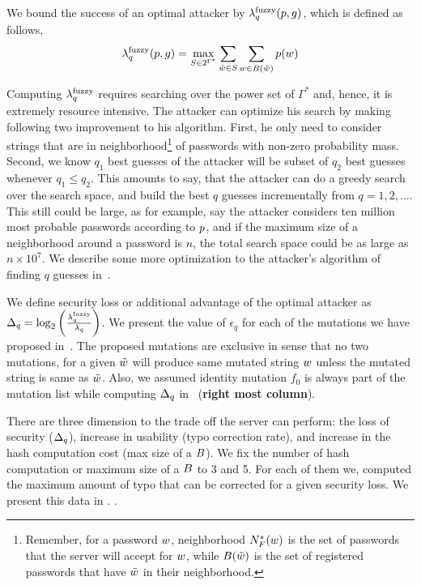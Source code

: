 We bound the success of an optimal attacker by
$\lambda^\textnormal{fuzzy}_q(p, g)$, which is defined as follows,
\[
  \lambda^\textnormal{fuzzy}_q(p, g) = \max_{S\in 2^{\Gamma^*}}\sum_{\tilde{w}\in S}\sum_{{w}\in B(\tilde{w})} p({w}) 
\]

Computing $\lambda^\textnormal{fuzzy}_q$ requires searching over the power set of
$\Gamma^*$ and, hence, it is extremely resource intensive. The
attacker can optimize his search by making following two improvement
to his algorithm. First, he only need to consider strings that are in
neighborhood\footnote{Remember, for a password ${w}$, neighborhood
  $N^*_F({w})$ is the set of passwords that the server will accept
  for ${w}$, while $B(\tilde{w})$ is the set of registered passwords
  that have $\tilde{w}$ in their neighborhood.} of passwords with
non-zero probability mass.  Second, we know $q_1$ best guesses of the
attacker will be subset of $q_2$ best guesses whenever $q_1\le q_2$.
This amounts to say, that the attacker can do a greedy search over the
search space, and build the best $q$ guesses incrementally from
$q=1,2,...$.  This still could be large, as for example, say the
attacker considers ten million most probable passwords according to
$p$, and if the maximum size of a neighborhood around a password
is $n$, the total search space could be as large as $n\times 10^7$. We
describe some more optimization to the attacker's algorithm of finding
$q$ guesses in~.


We define security loss or additional advantage of the optimal
attacker as
$ \Delta_q = \log_2\left(\lambda^\textnormal{fuzzy}_q\over\lambda_q\right)$.  We
present the value of $\epsilon_q$ for each of the mutations we have
proposed in~.  The proposed mutations are
exclusive in sense that no two mutations, for a given $\tilde{w}$ will
produce same mutated string ${w}$ unless the mutated string is same as
$\tilde{w}$. Also, we assumed identity mutation $f_0$ is always part of
the mutation list while computing $\Delta_q$
in~ (\textbf{right most column}).


There are three dimension to the trade off the server can perform: the
loss of security ($\Delta_q$), increase in usability (typo
correction rate), and increase in the hash computation cost (max size
of a $B$).  We fix the number of hash computation or maximum size
of a $B$ to 3 and 5. For each of them we, computed the maximum
amount of typo that can be corrected for a given security loss. We
present this data in .
.


